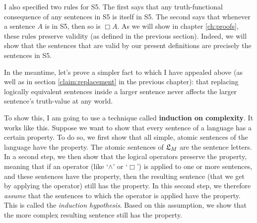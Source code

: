 
I also specified two rules for S5. The first says that any truth-functional
consequence of any sentences in S5 is itself in S5. The second says that
whenever a sentence $A$ is in S5, then so is $\Box A$. As we will show in chapter
\ref{ch:proofs}, these rules preserve validity (as defined in the previous
section). Indeed, we will show that the sentences that are
valid by our present definitions are precisely the sentences in S5.

In the meantime, let's prove a simpler fact to which I have appealed above (as
well as in section \ref{claim:replacement} in the previous chapter): that
replacing logically equivalent sentences inside a larger sentence never affects
the larger sentence's truth-value at any world.

To show this, I am going to use a technique called \textbf{induction on
  complexity}. It works like this. Suppose we want to show that every sentence
of a language has a certain property. To do so, we first show that all simple,
atomic sentences of the language have the property. The atomic sentences of
$\mathfrak{L}_{M}$ are the sentence letters. In a second step, we then show that the
logical operators preserve the property, meaning that if an operator (like
`$\land$' or `$\Box$') is applied to one or more sentences, and these sentences
have the property, then the resulting sentence (that we get by applying the
operator) still has the property. In this second step, we therefore
\emph{assume} that the sentences to which the operator is applied have the
property. This is called the \emph{induction hypothesis}. Based on this
assumption, we show that the more complex resulting sentence still has the
property.

